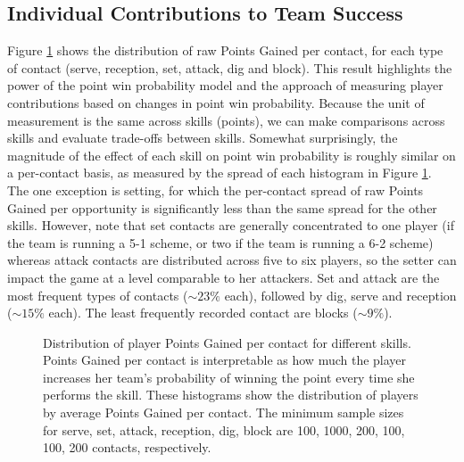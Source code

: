 \documentclass[USenglish]{article}
\theoremstyle{dgthm}
\theoremstyle{dgdef}
\begin{document}
\subsection{Individual Contributions to Team Success}
\label{sec:points-gained}

Figure \ref{fig:points-gained-per-opportunity} shows the distribution of raw Points Gained per contact, for each type of contact (serve, reception, set, attack, dig and block). This result highlights the power of the point win probability model and the approach of measuring player contributions based on changes in point win probability. Because the unit of measurement is the same across skills (points), we can make comparisons across skills and evaluate trade-offs between skills. Somewhat surprisingly, the magnitude of the effect of each skill on point win probability is roughly similar on a per-contact basis, as measured by the spread of each histogram in Figure \ref{fig:points-gained-per-opportunity}. The one exception is setting, for which the per-contact spread of raw Points Gained per opportunity is significantly less than the same spread for the other skills. However, note that set contacts are generally concentrated to one player (if the team is running a 5-1 scheme, or two if the team is running a 6-2 scheme) whereas attack contacts are distributed across five to six players, so the setter can impact the game at a level comparable to her attackers. Set and attack are the most frequent types of contacts ($\sim23\%$ each), followed by dig, serve and reception ($\sim15\%$ each). The least frequently recorded contact are blocks ($\sim9\%$).

\begin{figure}
    \centering
    \caption{Distribution of player Points Gained per contact for different skills. Points Gained per contact is interpretable as how much the player increases her team's probability of winning the point every time she performs the skill. These histograms show the distribution of players by average Points Gained per contact. The minimum sample sizes for serve, set, attack, reception, dig, block are 100, 1000, 200, 100, 100, 200 contacts, respectively.}
    \label{fig:points-gained-per-opportunity}
\end{figure}
\end{document}
